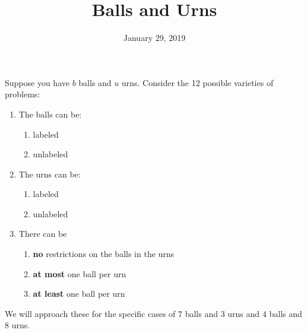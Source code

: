 \documentclass[12pt]{scrartcl}
\title{Balls and Urns}
\date{January 29, 2019}
\begin{document}
\maketitle
Suppose you have $b$ balls and $u$ urns. Consider the 12 possible varieties of problems: 
\begin{enumerate}
\item The balls can be: 
\begin{enumerate}
\item labeled 
\item unlabeled 
\end{enumerate}
\item The urns can be: 
\begin{enumerate}
\item labeled 
\item unlabeled 
\end{enumerate}
\item There can be  
\begin{enumerate}
\item \textbf{no} restrictions on the balls in the urns
\item \textbf{at most} one ball per urn
\item\textbf{at least} one ball per urn
\end{enumerate}
\end{enumerate}


We will approach these for the specific cases of $7$ balls and $3$ urns and $4$ balls and $8$ urns. 
\end{document}
